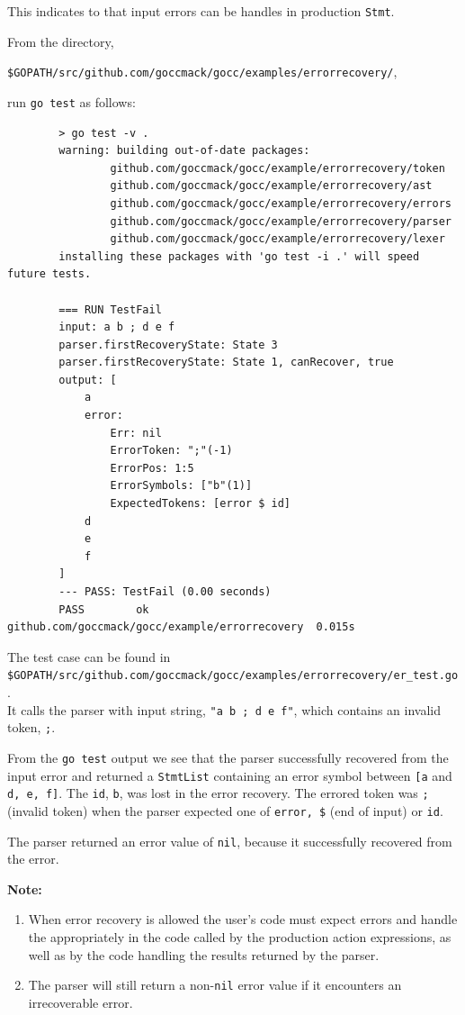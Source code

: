 \documentclass[12pt]{article}
\begin{document}
	This indicates to \gocc that input errors can be handles in production \verb|Stmt|.

	From the directory,

	\verb|$GOPATH/src/github.com/goccmack/gocc/examples/errorrecovery/|,

	run \verb|go test| as follows:

	\begin{verbatim}
		> go test -v .
		warning: building out-of-date packages:
		        github.com/goccmack/gocc/example/errorrecovery/token
		        github.com/goccmack/gocc/example/errorrecovery/ast
		        github.com/goccmack/gocc/example/errorrecovery/errors
		        github.com/goccmack/gocc/example/errorrecovery/parser
		        github.com/goccmack/gocc/example/errorrecovery/lexer
		installing these packages with 'go test -i .' will speed future tests.

		=== RUN TestFail
		input: a b ; d e f
		parser.firstRecoveryState: State 3
		parser.firstRecoveryState: State 1, canRecover, true
		output: [
		    a
		    error:
		        Err: nil
		        ErrorToken: ";"(-1)
		        ErrorPos: 1:5
		        ErrorSymbols: ["b"(1)]
		        ExpectedTokens: [error $ id]
		    d
		    e
		    f
		]
		--- PASS: TestFail (0.00 seconds)
		PASS		ok      github.com/goccmack/gocc/example/errorrecovery	0.015s
	\end{verbatim}

	The test case can be found in \\
	\verb|$GOPATH/src/github.com/goccmack/gocc/examples/errorrecovery/er_test.go|. \\
	It calls the parser with input string, \verb|"a b ; d e f"|, which contains an invalid token, \verb|;|.

	From the \verb|go test| output we see that the parser successfully recovered from the input error and returned a \verb|StmtList| containing an error symbol between \verb|[a| and \verb|d, e, f]|. The \verb|id|, \verb|b|, was lost in the error recovery.  The errored token was \verb|;| (invalid token) when the parser expected one of \verb|error, $| (end of input) or \verb|id|.

	The parser returned an error value of \verb|nil|, because it successfully recovered from the error.

	{\bf Note:} \\
	\begin{enumerate}
		\item When error recovery is allowed the user's code must expect errors and handle the appropriately in the code called by the production action expressions, as well as by the code handling the results returned by the parser.

		\item The parser will still return a non-\verb|nil| error value if it encounters an irrecoverable error.
	\end{enumerate}
\end{document}
